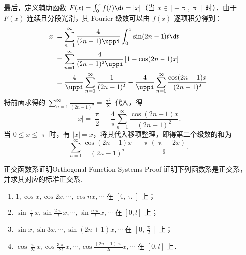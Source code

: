 \begin{solution}
    最后，定义辅助函数 $F(x) = \int_{0}^{x} f(t) \d t = |x|$（当 $x \in [-\uppi, \uppi]$ 时）．由于 $F(x)$ 连续且分段光滑，其 Fourier 级数可以由 $f(x)$ 逐项积分得到：
    \begin{equation}\label{eq:term-integration-3}
        \begin{aligned}
            |x| & = \sum_{n=1}^{\infty} \frac{4}{(2n-1)\uppi} \int_{0}^{x} \sin(2n-1)t \d t                                                    \\
                & = \sum_{n=1}^{\infty} \frac{4}{(2n-1)^2\uppi} \left[ 1 - \cos(2n-1)x \right]                                                 \\
                & = \frac{4}{\uppi} \sum_{n=1}^{\infty} \frac{1}{(2n-1)^2} - \frac{4}{\uppi} \sum_{n=1}^{\infty} \frac{\cos(2n-1)x}{(2n-1)^2}.
        \end{aligned}
    \end{equation}
    将前面求得的 $\sum_{n=1}^{\infty} \frac{1}{(2n-1)^2} = \frac{\uppi^2}{8}$ 代入，得
    \begin{equation}\label{eq:fx-subs-3}
        |x| = \frac{\uppi}{2} - \frac{4}{\uppi} \sum_{n=1}^{\infty} \frac{\cos(2n-1)x}{(2n-1)^2}.
    \end{equation}
    当 $0 \leqslant x \leqslant \uppi$ 时，有 $|x| = x$，将其代入移项整理，即得第二个级数的和为
    \begin{equation}
        \boxed{\sum_{n=1}^{\infty} \frac{\cos(2n-1)x}{(2n-1)^2} = \frac{\uppi(\uppi - 2x)}{8}}.
    \end{equation}
\end{solution}

\begin{problem}{正交函数系证明}{Orthogonal-Function-Systems-Proof}
    证明下列函数系是正交系，并求其对应的标准正交系．
    \begin{enumerate}
        \item $1, \cos x, \cos 2x, \cdots, \cos nx, \cdots$ 在 $[0, \uppi]$ 上；
        \item $\sin \frac{\uppi}{l}x, \sin \frac{2\uppi}{l}x, \cdots, \sin \frac{n\uppi}{l}x, \cdots$ 在 $[0, l]$ 上；
        \item $\sin x, \sin 3x, \cdots, \sin(2n+1)x, \cdots$ 在 $[0, \frac{\uppi}{2}]$ 上；
        \item $\cos \frac{\uppi}{2l}x, \cos \frac{3\uppi}{2l}x, \cdots, \cos \frac{(2n+1)\uppi}{2l}x, \cdots$ 在 $[0, l]$ 上．
    \end{enumerate}
\end{problem}

